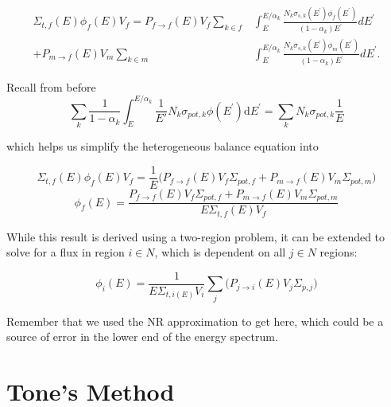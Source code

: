 \documentclass{beamer}
\begin{document}
\begin{frame}
\begin{align*}\Sigma_{t,f}(E)\phi_{f}(E)V_{f} = P_{f\rightarrow f}(E)V_{f}\sum\limits_{k\in f}&\int_{E}^{E/\alpha_{k}}\frac{N_{k}\sigma_{s,k}\left(E^{\prime}\right)\phi_{f}\left(E^{\prime}\right)}{\left(1-\alpha_{k}\right)E^{\prime}}dE^{\prime}  \\
+ P_{m\rightarrow f}(E)V_{m}\sum\limits_{k\in m}&\int_{E}^{E/\alpha_{k}}\frac{N_{k}\sigma_{s,k}\left(E^{\prime}\right)\phi_{m}\left(E^{\prime}\right)}{\left(1-\alpha_{k}\right)E^{\prime}}dE^{\prime}.\end{align*}


Recall from before
  \begin{equation*}{\sum\limits_{k}\frac{1}{1-\alpha_{k}}\int_{E}^{E/\alpha_{k}}\frac{1}{E'}N_{k}\sigma_{pot,k}\phi\left(E^{\prime}\right)\mathrm{d}E^{\prime}=\sum\limits_{k}N_{k}\sigma_{pot,k}\frac{1}{E}}\label{eq:NR-mainConclusion1}\end{equation*}

which helps us simplify the heterogeneous balance equation into

\begin{equation*}\Sigma_{t,f}(E)\phi_{f}(E)V_{f}=\frac{1}{E}\Big(P_{f\rightarrow f}(E)V_{f}\Sigma_{pot,f}+P_{m\rightarrow f}(E)V_{m}\Sigma_{pot,m}\Big)\end{equation*}
\begin{equation*}\phi_{f}(E)=\frac{P_{f\rightarrow f}(E)V_f\Sigma_{pot,f}+P_{m\rightarrow f}(E)V_m\Sigma_{pot,m}}{E\Sigma_{t,f}(E)V_f}\end{equation*}

  \end{frame}
  \begin{frame}
    While this result is derived using a two-region problem, it can be extended to solve for a flux in region $i\in N$, which is dependent on all $j\in N$ regions:

    \begin{equation*}\phi_{i}(E)=\frac{1}{E\Sigma_{t,i(E)}V_i}\sum\limits_j\Big(P_{j\rightarrow i}(E)V_{j}\Sigma_{p,j}\Big)\end{equation*}

  Remember that we used the NR approximation to get here, which could be a source of error in the lower end of the energy spectrum.
  \end{frame}




\section{Tone's Method}
\end{document}
